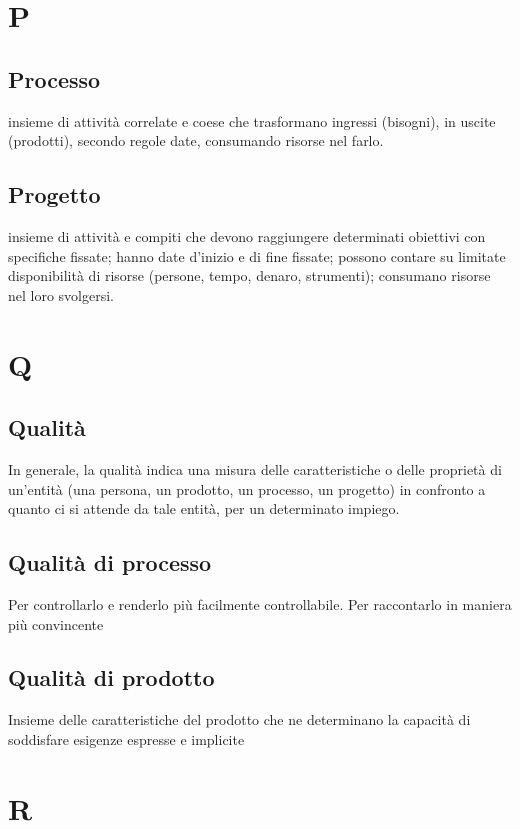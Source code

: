 	\section{P}
	
	\subsection{Processo} 
	insieme di attività correlate e coese che trasformano ingressi (bisogni), in uscite (prodotti), secondo regole date, consumando risorse nel farlo.

	\subsection{Progetto} 
	insieme di attività e compiti che devono raggiungere determinati
obiettivi con specifiche fissate; hanno date d’inizio e di fine fissate; possono
contare su limitate disponibilità di risorse (persone, tempo, denaro, strumenti); consumano risorse nel loro svolgersi.
	
	
	\section{Q}
	
	\subsection{Qualità} 
	In generale, la qualità indica una misura delle caratteristiche o delle proprietà di un’entità (una persona, un prodotto, un processo, un progetto) in confronto a quanto ci si attende da tale entità, per un determinato
impiego.
	\subsection{Qualità di processo}
Per controllarlo e renderlo più facilmente controllabile. Per raccontarlo in maniera più convincente
	\subsection{Qualità di prodotto}
	Insieme delle caratteristiche del prodotto che ne determinano la capacità di soddisfare esigenze espresse e implicite
	
	
	\section{R}

